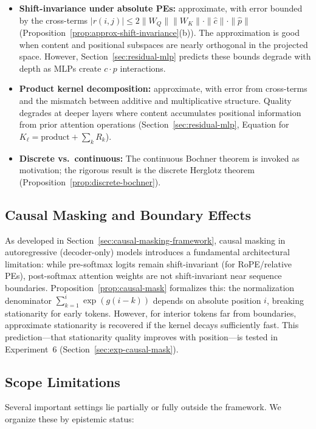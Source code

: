 \documentclass[11pt]{article}
\theoremstyle{definition}
\begin{document}
\begin{itemize}
    \item \textbf{Shift-invariance under absolute PEs:} approximate, with error bounded by the cross-terms $|r(i,j)| \leq 2\|W_Q\|\|W_K\| \cdot \|\hat{c}\| \cdot \|\hat{p}\|$ (Proposition~\ref{prop:approx-shift-invariance}(b)). The approximation is good when content and positional subspaces are nearly orthogonal in the projected space. However, Section~\ref{sec:residual-mlp} predicts these bounds degrade with depth as MLPs create $c \cdot p$ interactions.
    \item \textbf{Product kernel decomposition:} approximate, with error from cross-terms and the mismatch between additive and multiplicative structure. Quality degrades at deeper layers where content accumulates positional information from prior attention operations (Section~\ref{sec:residual-mlp}, Equation for $K_\ell = \text{product} + \sum_k R_k$).
    \item \textbf{Discrete vs.\ continuous:} The continuous Bochner theorem is invoked as motivation; the rigorous result is the discrete Herglotz theorem (Proposition~\ref{prop:discrete-bochner}).
\end{itemize}

\subsection{Causal Masking and Boundary Effects}
\label{sec:causal-masking}

As developed in Section~\ref{sec:causal-masking-framework}, causal masking in autoregressive (decoder-only) models introduces a fundamental architectural limitation: while pre-softmax logits remain shift-invariant (for RoPE/relative PEs), post-softmax attention weights are not shift-invariant near sequence boundaries. Proposition~\ref{prop:causal-mask} formalizes this: the normalization denominator $\sum_{k=1}^i \exp(g(i-k))$ depends on absolute position $i$, breaking stationarity for early tokens. However, for interior tokens far from boundaries, approximate stationarity is recovered if the kernel decays sufficiently fast. This prediction---that stationarity quality improves with position---is tested in Experiment~6 (Section~\ref{sec:exp-causal-mask}).

\subsection{Scope Limitations}

Several important settings lie partially or fully outside the framework. We organize these by epistemic status:
\end{document}
